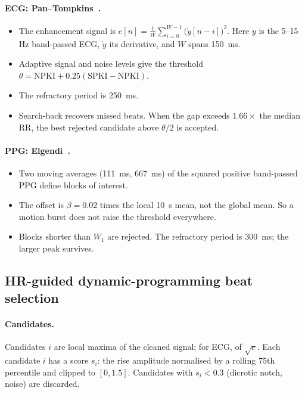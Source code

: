 \documentclass[10pt,a4paper]{article}
\begin{document}
\paragraph{ECG: Pan--Tompkins~\cite{pantompkins}.}
\begin{itemize}
  \item The enhancement signal is $e[n] = \frac1W\sum_{i=0}^{W-1} \big(\dot y[n-i]\big)^2$. Here $y$ is the
        5--15\,Hz band-passed ECG, $\dot y$ its derivative, and $W$ spans \SI{150}{ms}.
  \item Adaptive signal and noise levels give the threshold
        $\theta = \mathrm{NPKI}+0.25(\mathrm{SPKI}-\mathrm{NPKI})$.
  \item The refractory period is \SI{250}{ms}.
  \item Search-back recovers missed beats. When the gap exceeds $1.66\times$ the median RR, the best rejected candidate
        above $\theta/2$ is accepted.
\end{itemize}

\paragraph{PPG: Elgendi~\cite{elgendi2013}.}
\begin{itemize}
  \item Two moving averages (\SI{111}{ms}, \SI{667}{ms}) of the squared positive band-passed PPG define blocks of
        interest.
  \item The offset is $\beta=0.02$ times the local \SI{10}{s} mean, not the global mean. So a motion burst does not
        raise the threshold everywhere.
  \item Blocks shorter than $W_1$ are rejected. The refractory period is \SI{300}{ms}; the larger peak survives.
\end{itemize}

\subsection{HR-guided dynamic-programming beat selection}\label{sec:dp}
\paragraph{Candidates.}
Candidates $i$ are local maxima of the cleaned signal; for ECG, of $\sqrt e$. Each candidate $i$ has a score
$s_i$: the rise amplitude normalised by a rolling 75th percentile and clipped to $[0,1.5]$. Candidates with
$s_i<0.3$ (dicrotic notch, noise) are discarded.
\end{document}
